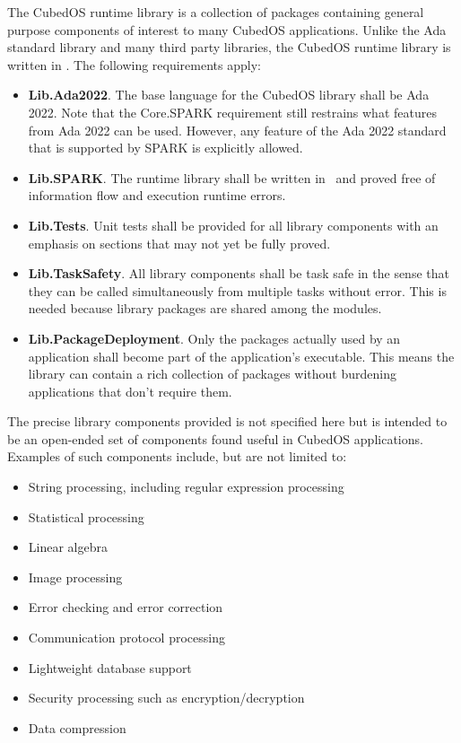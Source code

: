 The CubedOS runtime library is a collection of packages containing general purpose components of
interest to many CubedOS applications. Unlike the Ada standard library and many third party
libraries, the CubedOS runtime library is written in \SPARK. The following requirements apply:

\begin{itemize}
\item \textbf{Lib.Ada2022}. The base language for the CubedOS library shall be Ada 2022. Note
that the Core.SPARK requirement still restrains what features from Ada 2022 can be used.
However, any feature of the Ada 2022 standard that is supported by SPARK is explicitly allowed.
  
\item \textbf{Lib.SPARK}. The runtime library shall be written in \SPARK\ and proved free of
information flow and execution runtime errors.

\item \textbf{Lib.Tests}. Unit tests shall be provided for all library components with an
emphasis on sections that may not yet be fully proved.

\item \textbf{Lib.TaskSafety}. All library components shall be task safe in the sense that they
can be called simultaneously from multiple tasks without error. This is needed because library
packages are shared among the modules.

\item \textbf{Lib.PackageDeployment}. Only the packages actually used by an application shall
become part of the application's executable. This means the library can contain a rich
collection of packages without burdening applications that don't require them.
\end{itemize}

The precise library components provided is not specified here but is intended to be an
open-ended set of components found useful in CubedOS applications. Examples of such components
include, but are not limited to:

\begin{itemize}
\item String processing, including regular expression processing
\item Statistical processing
\item Linear algebra
\item Image processing
\item Error checking and error correction
\item Communication protocol processing
\item Lightweight database support
\item Security processing such as encryption/decryption
\item Data compression
\end{itemize}

